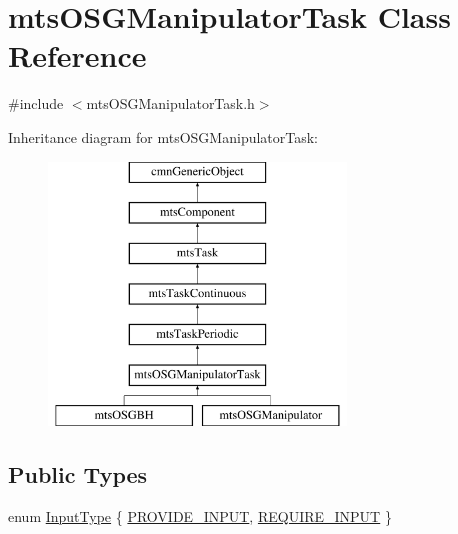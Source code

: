 \hypertarget{classmts_o_s_g_manipulator_task}{}\section{mts\+O\+S\+G\+Manipulator\+Task Class Reference}
\label{classmts_o_s_g_manipulator_task}


{\ttfamily \#include $<$mts\+O\+S\+G\+Manipulator\+Task.\+h$>$}

Inheritance diagram for mts\+O\+S\+G\+Manipulator\+Task\+:\begin{figure}[H]
\begin{center}
\leavevmode
\includegraphics[height=7.000000cm]{d7/db9/classmts_o_s_g_manipulator_task}
\end{center}
\end{figure}
\subsection*{Public Types}
\begin{DoxyCompactItemize}
\item 
enum \hyperlink{classmts_o_s_g_manipulator_task_a176aa50980ddf34d1150514bb620cb8f}{Input\+Type} \{ \hyperlink{classmts_o_s_g_manipulator_task_a176aa50980ddf34d1150514bb620cb8fa73f760c3f4b883d0ce1a241d172e626a}{P\+R\+O\+V\+I\+D\+E\+\_\+\+I\+N\+P\+U\+T}, 
\hyperlink{classmts_o_s_g_manipulator_task_a176aa50980ddf34d1150514bb620cb8fa7ff96839bee571149d1dbf57ca86cda8}{R\+E\+Q\+U\+I\+R\+E\+\_\+\+I\+N\+P\+U\+T}
 \}
\end{DoxyCompactItemize}
